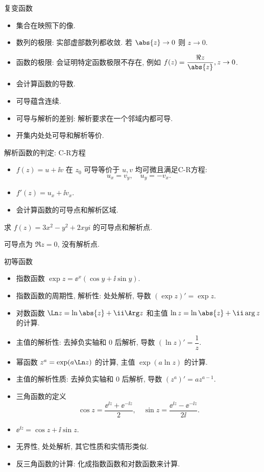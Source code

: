 \documentclass[aspectratio=169,handout]{ctexbeamer}
\begin{document}
\begin{frame}{复变函数}
	\begin{itemize}
		\item 集合在映照下的像.
		\item 数列的极限: 实部虚部数列都收敛. 若 $\abs{z}\to0$ 则 $z\to0$.
		\item 函数的极限: 会证明特定函数极限不存在, 例如 $f(z)=\dfrac{\Re z}{\abs{z}}, z\to 0$.
		\item 会计算函数的导数.
		\item 可导蕴含连续.
		\item 可导与解析的差别: 解析要求在一个邻域内都可导.
		\item 开集内处处可导和解析等价.
	\end{itemize}
\end{frame}


\begin{frame}{解析函数的判定: C-R方程}
	\begin{itemize}
		\item $f(z)=u+\ii v$ 在 $z_0$ 可导等价于 $u,v$ 均可微且满足C-R方程:
	\[
		u_x=v_y,\quad u_y=-v_x.
	\]
		\item $f'(z)=u_x+\ii v_x$.
		\item 会计算函数的可导点和解析区域.
	\end{itemize}
	\onslide<+->
	\begin{exercise}
		求 $f(z)=3x^2-y^2+2xyi$ 的可导点和解析点.
	\end{exercise}
	\onslide<+->
	\begin{answer}
		可导点为 $\Re z=0$, 没有解析点.
	\end{answer}
\end{frame}


\begin{frame}{初等函数}
	\begin{itemize}
		\item 指数函数 $\exp z=\ee^x(\cos y+\ii\sin y)$.
		\item 指数函数的周期性, 解析性: 处处解析, 导数 $(\exp z)'=\exp z$.
		\item 对数函数 $\Ln z=\ln\abs{z}+\ii\Arg z$ 和主值 $\ln z=\ln\abs{z}+\ii\arg z$ 的计算.
		\item 主值的解析性: 去掉负实轴和 $0$ 后解析, 导数 $(\ln z)'=\dfrac1z$.
		\item 幂函数 $z^a=\exp(a\Ln z)$ 的计算, 主值 $\exp(a\ln z)$ 的计算.
		\item 主值的解析性质: 去掉负实轴和 $0$ 后解析, 导数 $(z^a)'=az^{a-1}$.
		\item 三角函数的定义
	\[
			\cos z=\frac{\ee^{\ii z}+\ee^{-\ii z}}2,\quad
			\sin z=\frac{\ee^{\ii z}-\ee^{-\ii z}}{2\ii}.
	\]
		\item $\ee^{\ii z}=\cos z+\ii\sin z$.
		\item 无界性, 处处解析, 其它性质和实情形类似.
		\item 反三角函数的计算: 化成指数函数和对数函数来计算.
	\end{itemize}
\end{frame}
\end{document}
